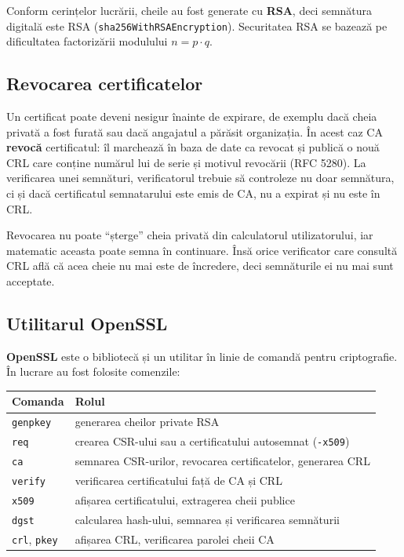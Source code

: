 \documentclass[12pt,a4paper]{article}
\begin{document}
Conform cerințelor lucrării, cheile au fost generate cu \textbf{RSA}, deci
semnătura digitală este RSA (\texttt{sha256WithRSAEncryption}). Securitatea RSA
se bazează pe dificultatea factorizării modulului $n = p \cdot q$.

\subsection{Revocarea certificatelor}

Un certificat poate deveni nesigur înainte de expirare, de exemplu dacă cheia
privată a fost furată sau dacă angajatul a părăsit organizația. În acest caz CA
\textbf{revocă} certificatul: îl marchează în baza de date ca revocat și
publică o nouă CRL care conține numărul lui de serie și motivul revocării
(RFC 5280). La verificarea unei semnături, verificatorul trebuie să controleze
nu doar semnătura, ci și dacă certificatul semnatarului este emis de CA, nu a
expirat și nu este în CRL.

Revocarea nu poate \enquote{șterge} cheia privată din calculatorul
utilizatorului, iar matematic aceasta poate semna în continuare. Însă orice
verificator care consultă CRL află că acea cheie nu mai este de încredere, deci
semnăturile ei nu mai sunt acceptate.

\subsection{Utilitarul OpenSSL}

\textbf{OpenSSL} este o bibliotecă și un utilitar în linie de comandă pentru
criptografie. În lucrare au fost folosite comenzile:

\begin{center}
\renewcommand{\arraystretch}{1.2}
\begin{tabularx}{\textwidth}{@{}lX@{}}
\toprule
\textbf{Comanda} & \textbf{Rolul} \\
\midrule
\texttt{genpkey} & generarea cheilor private RSA \\
\texttt{req} & crearea CSR-ului sau a certificatului autosemnat (\texttt{-x509}) \\
\texttt{ca} & semnarea CSR-urilor, revocarea certificatelor, generarea CRL \\
\texttt{verify} & verificarea certificatului față de CA și CRL \\
\texttt{x509} & afișarea certificatului, extragerea cheii publice \\
\texttt{dgst} & calcularea hash-ului, semnarea și verificarea semnăturii \\
\texttt{crl}, \texttt{pkey} & afișarea CRL, verificarea parolei cheii CA \\
\bottomrule
\end{tabularx}
\end{center}
\end{document}
